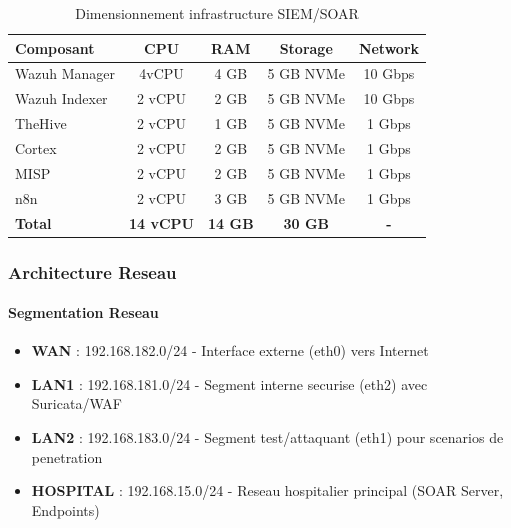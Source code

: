 \begin{table}[H]
    \centering
    \caption{Dimensionnement infrastructure SIEM/SOAR}
    \begin{tabular}{|l|c|c|c|c|}
        \hline
        \textbf{Composant} & \textbf{CPU}     & \textbf{RAM}   & \textbf{Storage} & \textbf{Network} \\
        \hline
        Wazuh Manager      & 4vCPU            & 4 GB           & 5 GB NVMe        & 10 Gbps          \\
        \hline
        Wazuh Indexer      & 2 vCPU           & 2 GB           & 5 GB NVMe        & 10 Gbps          \\
        \hline
        TheHive            & 2 vCPU           & 1 GB           & 5 GB NVMe        & 1 Gbps           \\
        \hline
        Cortex             & 2 vCPU           & 2 GB           & 5 GB NVMe        & 1 Gbps           \\
        \hline
        MISP               & 2 vCPU           & 2 GB           & 5 GB NVMe        & 1 Gbps           \\
        \hline
        n8n                & 2 vCPU           & 3 GB           & 5 GB NVMe        & 1 Gbps           \\
        \hline
        \textbf{Total}     & \textbf{14 vCPU} & \textbf{14 GB} & \textbf{30 GB}   & \textbf{-}       \\
        \hline
    \end{tabular}
\end{table}

\subsubsection{Architecture Reseau}

\paragraph{Segmentation Reseau}
\begin{itemize}
    \item \textbf{WAN} : 192.168.182.0/24 - Interface externe (eth0) vers Internet
    \item \textbf{LAN1} : 192.168.181.0/24 - Segment interne securise (eth2) avec Suricata/WAF
    \item \textbf{LAN2} : 192.168.183.0/24 - Segment test/attaquant (eth1) pour scenarios de penetration
    \item \textbf{HOSPITAL} : 192.168.15.0/24 - Reseau hospitalier principal (SOAR Server, Endpoints)
\end{itemize}



